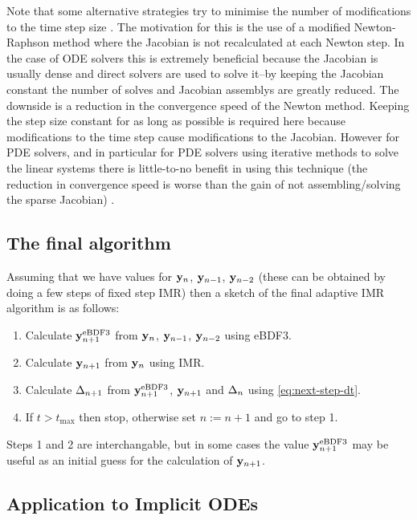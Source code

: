 Note that some alternative strategies try to minimise the number of modifications to the time step size \cite[chap. 6]{Iserles2009} \cite[Sec. 2.1]{cvode-manual}.
The motivation for this is the use of a modified Newton-Raphson method where the Jacobian is not recalculated at each Newton step.
In the case of ODE solvers this is extremely beneficial because the Jacobian is usually dense and direct solvers are used to solve it--by keeping the Jacobian constant the number of solves and Jacobian assemblys are greatly reduced.
The downside is a reduction in the convergence speed of the Newton method.
Keeping the step size constant for as long as possible is required here because modifications to the time step cause modifications to the Jacobian.
However for PDE solvers, and in particular for PDE solvers using iterative methods to solve the linear systems there is little-to-no benefit in using this technique (the reduction in convergence speed is worse than the gain of not assembling/solving the sparse Jacobian) \cite[128]{Iserles2009}.


\subsection{The final algorithm}

Assuming that we have values for $\mathbf{y}_n$, $\mathbf{y}_{n-1}$, $\mathbf{y}_{n-2}$ (these can be obtained \eg by doing a few steps of fixed step IMR) then a sketch of the final adaptive IMR algorithm is as follows:
\begin{enumerate}
\item Calculate $\mathbf{y}_{n+1}^{\text{eBDF3}}$ from $\mathbf{y}_n$, $\mathbf{y}_{n-1}$, $\mathbf{y}_{n-2}$ using eBDF3.
\item Calculate $\mathbf{y}_{n+1}$ from $\mathbf{y}_n$ using IMR.
\item Calculate $\Delta_{n+1}$ from $\mathbf{y}_{n+1}^{\text{eBDF3}}$, $\mathbf{y}_{n+1}$ and $\Delta_{n}$ using
  \cref{eq:next-step-dt}.
\item If $t > t_{\text{max}}$ then stop, otherwise set $n := n+1$ and go to step 1.
\end{enumerate}

Steps 1 and 2 are interchangable, but in some cases the value $\mathbf{y}_{n+1}^{\text{eBDF3}}$ may be useful as an initial guess for the calculation of $\mathbf{y}_{n+1}$.


\subsection{Application to Implicit ODEs}
\label{sec:extens-impl-odes}

